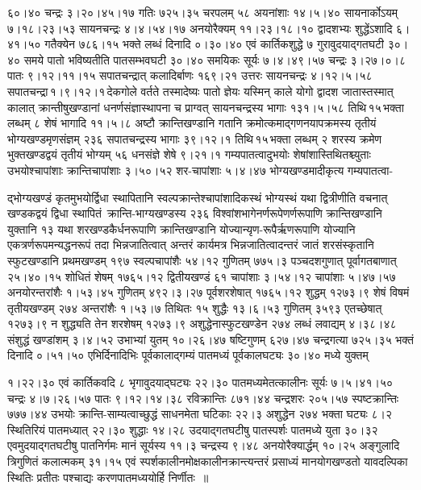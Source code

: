 \documentclass[11pt, openany]{book}
\begin{document}
\begin{sloppypar}
\noindent ६०।४० चन्द्रः ३।२०।४५।१७ गतिः ७२५।३५ चरपलम् ५८ अयनांशाः १४।५।४० सायनार्कोऽयम् ७।१८।२३।५३ सायनचन्द्रः ४।४।५४।१७ अनयोरैक्यम् ११।२३।१८।१० द्वादशभ्यः शुद्धेंऽशादि ६।४१।५० गतैक्येन ७८६।१५ भक्ते लब्धं दिनादि ०।३०।४० एवं कार्तिकशुद्धे ७ गुरावुदयाद्गतघटी ३०।४० समये पातो भविष्यतीति पातसम्भवघटी ३०।४० समयिकः सूर्यः ७।४।४९।५७ चन्द्रः ३।२७।०।८ पातः ९।१२।११।१५ सपातचन्द्रात् कलादिर्बाणः १६९।२१ उत्तरः सायनचन्द्रः ४।१२।५।५८ सपातचन्द्रा\textendash \,१।९।१२।१\textendash \,देकगोले वर्तते तस्मादेष्यः पातो ज्ञेयः यस्मिन् काले योगो द्वादश जातास्तस्मात् कालात् क्रान्तीषुखण्डानां धनर्णसंज्ञास्थापना च प्राग्वत् सायनचन्द्रस्य भागाः १३१।५।५८ तिथि\textendash \,१५\textendash \,भक्ता लब्धम् ८ शेषं भागादि ११।५।८ अष्टौ क्रान्तिखण्डानि गतानि क्रमोत्कमाद्गणनयापक्रमस्य तृतीयं भोग्यखण्डमृणसंज्ञम् २३६ सपातचन्द्रस्य भागाः ३९।१२।१ तिथि\textendash \,१५\textendash \,भक्ता लब्धम् २ शरस्य क्रमेण भुक्तखण्डद्वयं तृतीयं भोग्यम् ५६ धनसंज्ञे शेषे ९।२१।१ गम्यपातत्वादुभयोः शेषांशास्तिथितश्च्युताः उभयोश्चापांशाः क्रान्तिचापांशाः ३।५०।५२ शर-चापांशाः ५।४।४७ भोग्यखण्डमादीकृत्य गम्यपातत्वा-
\end{sloppypar}

\newpage

\begin{sloppypar}
\noindent द्भोग्यखण्डं कृतमुभयोर्द्विधा स्थापितानि स्वल्पक्रान्तेश्चापांशादिकस्थं भोग्यस्थं यथा द्वित्रीणीति वचनात् खण्डकद्वयं द्विधा स्थापितं~क्रान्ति-भाग्यखण्डस्य २३६ विश्वांशभागेनर्णरूपेणर्णरूपाणि क्रान्तिखण्डानि युक्तानि १३ यथा शरखण्डकैर्धनरूपाणि क्रान्तिखण्डानि योज्यान्यृण-रूपैर्ऋणरूपाणि योज्यानि एकत्रर्णरूपमन्यद्धनरूपं तदा भिन्नजातित्वात् अन्तरं कार्यमत्र भिन्नजातित्वादन्तरं जातं शरसंस्कृतानि स्फुटखण्डानि प्रथमखण्डम् १९७ स्वल्पचापांशैः ५४।१२ गुणितम् ७७५।३ पञ्चदशगुणात् पूर्वागतबाणात् २५।४०।१५ शोधितं शेषम् १७६५।१२ द्वितीयखण्डं ६१ चापांशाः ३।५४।१२ चापांशाः ५।४७।५७ अनयोरन्तरांशैः १।५३।४५ गुणितम् ४९२।३।२७ पूर्वशरशेषात् १७६५।१२ शुद्धम् १२७३।९ शेषं विषमं तृतीयखण्डम् २७४ अन्तरांशैः १।५३।७ तिथितः १५ शुद्धैः १३।६।५३ गुणितम् ३५९३ एतच्छेषात् १२७३।९ न शुद्ध्यति तेन शरशेषम् १२७३।९ अशुद्धेनास्फुटखण्डेन २७४ लब्धं लवाद्यम् ४।३८।४८ संशुद्धं खण्डांशम् ३।४।५२ उभाभ्यां युतम् १०।२६।४७ षष्टिगुणम् ६२७।४७ चन्द्रगत्या ७२५।३५ भक्तं दिनादि ०।५१।५० एभिर्दिनादिभिः पूर्वकालाद्गम्यं पातमध्यं पूर्वकालघट्यः ३०।४० मध्ये युक्तम्
\end{sloppypar}

\newpage

\begin{sloppypar}
\noindent १।२२।३० एवं कार्तिकवदि ८ भृगावुदयाद्घट्यः २२।३० पातमध्यमेतत्कालीनः सूर्यः ७।५।४१।५० चन्द्रः ४।७।२६।५७ पातः ९।१२।१४।३८ रविक्रान्तिः ८७१।४४ चन्द्रशरः २०५।५७ स्पष्टक्रान्तिः ७७७।४४ उभयोः क्रान्ति-साम्यत्वाच्छुद्धं साधनमेता घटिकाः २२।३ अशुद्धेन २७४ भक्ता घट्यः ८।२ स्थितिरियं पातमध्यात् २२।३० शुद्धाः १४।२८ उदयाद्गतघटीषु पातस्पर्शः पातमध्ये युता ३०।३२ एवमुदयाद्गतघटीषु पातनिर्गमः मानं सूर्यस्य ११।३ चन्द्रस्य ९।४८ अनयोरैक्यार्द्धम् १०।२५ अङ्गुलादि त्रिगुणितं कलात्मकम् ३१।१५ एवं स्पर्शकालीनमोक्षकालीनक्रान्त्यन्तरं प्रसाध्यं मानयोगखण्डतो यावदल्पिका स्थितिः प्रतीतः पश्चाद्यः करणपातमध्ययोर्हि निर्णीतः~॥
\end{sloppypar}
\vspace{2mm}
\end{document}
